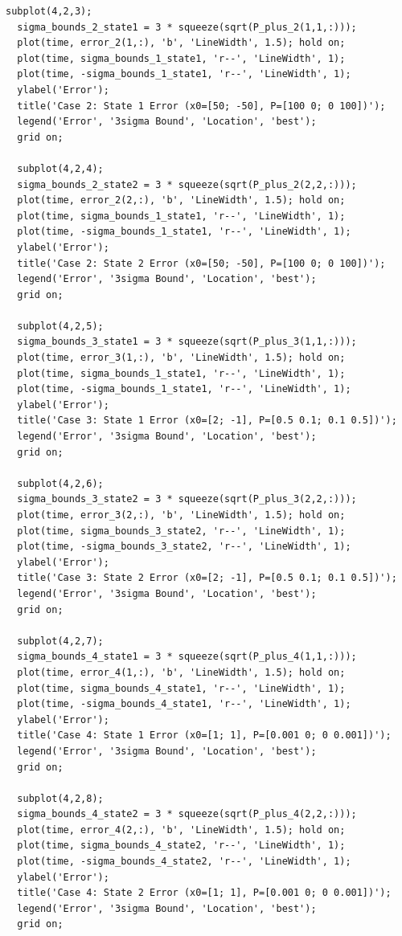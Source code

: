 \documentclass[12pt,A4, onecolumn]{exam}
\begin{document}
\begin{questions}
\begin{lstlisting}[style=matlabstyle]
  subplot(4,2,3);
  sigma_bounds_2_state1 = 3 * squeeze(sqrt(P_plus_2(1,1,:)));
  plot(time, error_2(1,:), 'b', 'LineWidth', 1.5); hold on;
  plot(time, sigma_bounds_1_state1, 'r--', 'LineWidth', 1);
  plot(time, -sigma_bounds_1_state1, 'r--', 'LineWidth', 1);
  ylabel('Error');
  title('Case 2: State 1 Error (x0=[50; -50], P=[100 0; 0 100])');
  legend('Error', '3sigma Bound', 'Location', 'best');
  grid on;

  subplot(4,2,4);
  sigma_bounds_2_state2 = 3 * squeeze(sqrt(P_plus_2(2,2,:)));
  plot(time, error_2(2,:), 'b', 'LineWidth', 1.5); hold on;
  plot(time, sigma_bounds_1_state1, 'r--', 'LineWidth', 1);
  plot(time, -sigma_bounds_1_state1, 'r--', 'LineWidth', 1);
  ylabel('Error');
  title('Case 2: State 2 Error (x0=[50; -50], P=[100 0; 0 100])');
  legend('Error', '3sigma Bound', 'Location', 'best');
  grid on;

  subplot(4,2,5);
  sigma_bounds_3_state1 = 3 * squeeze(sqrt(P_plus_3(1,1,:)));
  plot(time, error_3(1,:), 'b', 'LineWidth', 1.5); hold on;
  plot(time, sigma_bounds_1_state1, 'r--', 'LineWidth', 1);
  plot(time, -sigma_bounds_1_state1, 'r--', 'LineWidth', 1);
  ylabel('Error');
  title('Case 3: State 1 Error (x0=[2; -1], P=[0.5 0.1; 0.1 0.5])');
  legend('Error', '3sigma Bound', 'Location', 'best');
  grid on;

  subplot(4,2,6);
  sigma_bounds_3_state2 = 3 * squeeze(sqrt(P_plus_3(2,2,:)));
  plot(time, error_3(2,:), 'b', 'LineWidth', 1.5); hold on;
  plot(time, sigma_bounds_3_state2, 'r--', 'LineWidth', 1);
  plot(time, -sigma_bounds_3_state2, 'r--', 'LineWidth', 1);
  ylabel('Error');
  title('Case 3: State 2 Error (x0=[2; -1], P=[0.5 0.1; 0.1 0.5])');
  legend('Error', '3sigma Bound', 'Location', 'best');
  grid on;

  subplot(4,2,7);
  sigma_bounds_4_state1 = 3 * squeeze(sqrt(P_plus_4(1,1,:)));
  plot(time, error_4(1,:), 'b', 'LineWidth', 1.5); hold on;
  plot(time, sigma_bounds_4_state1, 'r--', 'LineWidth', 1);
  plot(time, -sigma_bounds_4_state1, 'r--', 'LineWidth', 1);
  ylabel('Error');
  title('Case 4: State 1 Error (x0=[1; 1], P=[0.001 0; 0 0.001])');
  legend('Error', '3sigma Bound', 'Location', 'best');
  grid on;

  subplot(4,2,8);
  sigma_bounds_4_state2 = 3 * squeeze(sqrt(P_plus_4(2,2,:)));
  plot(time, error_4(2,:), 'b', 'LineWidth', 1.5); hold on;
  plot(time, sigma_bounds_4_state2, 'r--', 'LineWidth', 1);
  plot(time, -sigma_bounds_4_state2, 'r--', 'LineWidth', 1);
  ylabel('Error');
  title('Case 4: State 2 Error (x0=[1; 1], P=[0.001 0; 0 0.001])');
  legend('Error', '3sigma Bound', 'Location', 'best');
  grid on;


\end{lstlisting}
\end{questions}
\end{document}
